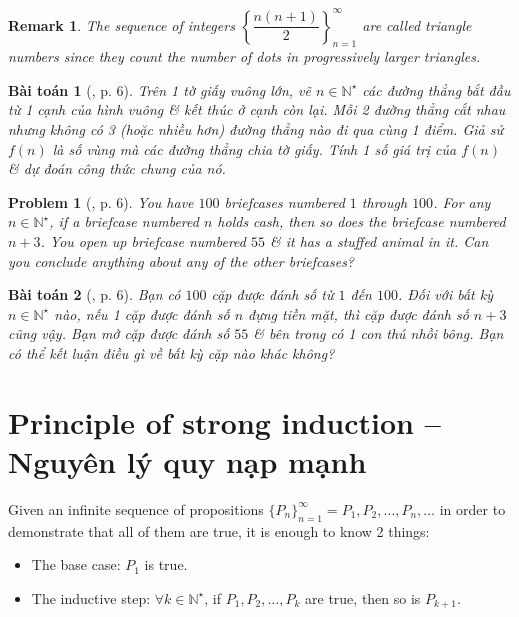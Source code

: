 \documentclass[oneside]{book}
\newtheorem{baitoan}{Bài toán}
\newtheorem{problem}{Problem}
\newtheorem{remark}{Remark}
\begin{document}
\begin{remark}
	The sequence of integers $\left\{\dfrac{n(n + 1)}{2}\right\}_{n=1}^\infty$ are called {\rm triangle numbers} since they count the number of dots in progressively larger triangles.
\end{remark}

\begin{baitoan}[\cite{Shahriari2022}, p. 6]
	Trên 1 tờ giấy vuông lớn, vẽ $n\in\mathbb{N}^\star$ các đường thẳng bắt đầu từ 1 cạnh của hình vuông \& kết thúc ở cạnh còn lại. Mỗi 2 đường thẳng cắt nhau nhưng không có 3 (hoặc nhiều hơn) đường thẳng nào đi qua cùng 1 điểm. Giả sử $f(n)$ là số vùng mà các đường thẳng chia tờ giấy. Tính 1 số giá trị của $f(n)$ \& dự đoán công thức chung của nó.
\end{baitoan}

\begin{problem}[\cite{Shahriari2022}, p. 6]
	You have $100$ briefcases numbered $1$ through $100$. For any $n\in\mathbb{N}^\star$, if a briefcase numbered $n$ holds cash, then so does the briefcase numbered $n + 3$. You open up briefcase numbered $55$ \& it has a stuffed animal in it. Can you conclude anything about any of the other briefcases?
\end{problem}

\begin{baitoan}[\cite{Shahriari2022}, p. 6]
	Bạn có $100$ cặp được đánh số từ $1$ đến $100$. Đối với bất kỳ $n\in\mathbb{N}^\star$ nào, nếu 1 cặp được đánh số $n$ đựng tiền mặt, thì cặp được đánh số $n + 3$ cũng vậy. Bạn mở cặp được đánh số $55$ \& bên trong có 1 con thú nhồi bông. Bạn có thể kết luận điều gì về bất kỳ cặp nào khác không?	
\end{baitoan}


\section{Principle of strong induction -- Nguyên lý quy nạp mạnh}
Given an infinite sequence of propositions $\{P_n\}_{n=1}^\infty = P_1,P_2,\ldots,P_n,\ldots$ in order to demonstrate that all of them are true, it is enough to know 2 things:
\begin{itemize}
	\item The base case: $P_1$ is true.
	\item The inductive step: $\forall k\in\mathbb{N}^\star$, if $P_1,P_2,\ldots,P_k$ are true, then so is $P_{k+1}$.
\end{itemize}
\end{document}
